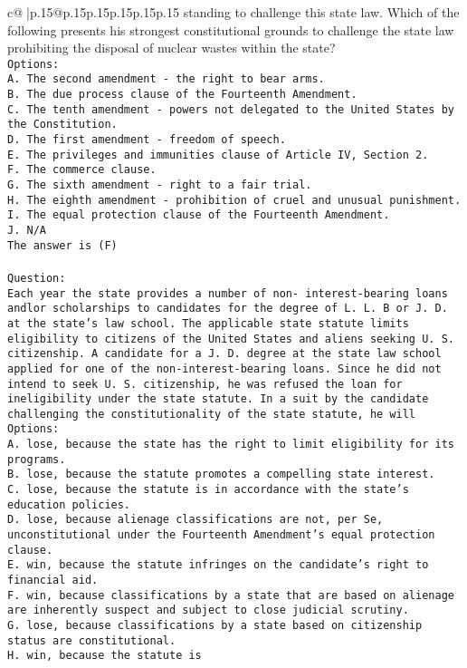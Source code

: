 \documentclass{article}
\begin{document}
{\begin{supertabular}{c@{$\;$}|p{.15\linewidth}@{}p{.15\linewidth}p{.15\linewidth}p{.15\linewidth}p{.15\linewidth}p{.15\linewidth}}
{{{standing to challenge this state law. Which of the following presents his strongest constitutional grounds to challenge the state law prohibiting the disposal of nuclear wastes within the state?\\ \tt Options:\\ \tt A. The second amendment - the right to bear arms.\\ \tt B. The due process clause of the Fourteenth Amendment.\\ \tt C. The tenth amendment - powers not delegated to the United States by the Constitution.\\ \tt D. The first amendment - freedom of speech.\\ \tt E. The privileges and immunities clause of Article IV, Section 2.\\ \tt F. The commerce clause.\\ \tt G. The sixth amendment - right to a fair trial.\\ \tt H. The eighth amendment - prohibition of cruel and unusual punishment.\\ \tt I. The equal protection clause of the Fourteenth Amendment.\\ \tt J. N/A\\ \tt The answer is (F)\\ \tt \\ \tt Question:\\ \tt Each year the state provides a number of non- interest-bearing loans andlor scholarships to candidates for the degree of L. L. B or J. D. at the state's law school. The applicable state statute limits eligibility to citizens of the United States and aliens seeking U. S. citizenship. A candidate for a J. D. degree at the state law school applied for one of the non-interest-bearing loans. Since he did not intend to seek U. S. citizenship, he was refused the loan for ineligibility under the state statute. In a suit by the candidate challenging the constitutionality of the state statute, he will\\ \tt Options:\\ \tt A. lose, because the state has the right to limit eligibility for its programs.\\ \tt B. lose, because the statute promotes a compelling state interest.\\ \tt C. lose, because the statute is in accordance with the state's education policies.\\ \tt D. lose, because alienage classifications are not, per Se, unconstitutional under the Fourteenth Amendment's equal protection clause.\\ \tt E. win, because the statute infringes on the candidate's right to financial aid.\\ \tt F. win, because classifications by a state that are based on alienage are inherently suspect and subject to close judicial scrutiny.\\ \tt G. lose, because classifications by a state based on citizenship status are constitutional.\\ \tt H. win, because the statute is }}}
\end{supertabular}}
\end{document}
